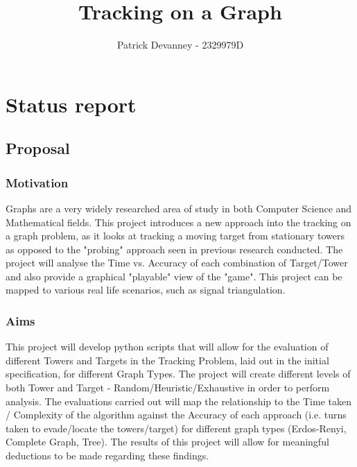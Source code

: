 \documentclass[11pt]{article}
\title{Tracking on a Graph}
\author{Patrick Devanney - 2329979D }
\begin{document}
\maketitle

\section{Status report}

\subsection{Proposal}\label{proposal}

\subsubsection{Motivation}\label{motivation}

Graphs are a very widely researched area of study in both Computer Science and Mathematical fields. This project introduces a new approach into the tracking on a graph problem, as it looks at tracking a moving target from stationary towers as opposed to the "probing" approach seen in previous research conducted. The project will analyse the Time vs. Accuracy of each combination of Target/Tower and also provide a graphical "playable" view of the "game". This project can be mapped to various real life scenarios, such as signal triangulation.

\subsubsection{Aims}\label{aims}

This project will develop python scripts that will allow for the evaluation of different Towers and Targets in the Tracking Problem, laid out in the initial specification, for different Graph Types. The project will create different levels of both Tower and Target - Random/Heuristic/Exhaustive in order to perform analysis. The evaluations carried out will map the relationship to the Time taken / Complexity of the algorithm against the Accuracy of each approach (i.e. turns taken to evade/locate the towers/target) for different graph types (Erdos-Renyi, Complete Graph, Tree). The results of this project will allow for meaningful deductions to be made regarding these findings.
\end{document}
